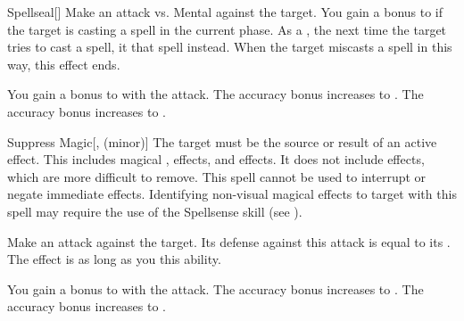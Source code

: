 \lowercase{\hypertarget{spell:Spellseal}{}}\label{spell:Spellseal}
\begin{freeability}[Rank 2]{\hypertarget{spell:Spellseal}{Spellseal}}[]
Make an attack vs. Mental against the target.
You gain a  bonus to  if the target is casting a spell in the current phase.
\hit As a , the next time the target tries to cast a spell, it  that spell instead.
When the target miscasts a spell in this way, this effect ends.

\rankline
{} You gain a  bonus to  with the attack.
 The accuracy bonus increases to .
 The accuracy bonus increases to .
\end{freeability}
\vspace{0.25em}



\lowercase{\hypertarget{spell:Suppress Magic}{}}\label{spell:Suppress Magic}
\begin{freeability}[Rank 2]{\hypertarget{spell:Suppress Magic}{Suppress Magic}}[,  (minor)]
The target must be the source or result of an active  effect.
This includes magical ,  effects, and  effects.
It does not include  effects, which are more difficult to remove.
This spell cannot be used to interrupt or negate immediate effects.
Identifying non-visual magical effects to target with this spell may require the use of the Spellsense skill (see ).

Make an attack against the target.
Its defense against this attack is equal to its .
\hit The effect is  as long as you  this ability.

\rankline
{} You gain a  bonus to  with the attack.
 The accuracy bonus increases to .
 The accuracy bonus increases to .
\end{freeability}
\vspace{0.25em}



